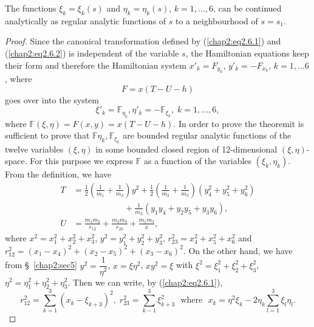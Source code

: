 \begin{subtheorem}\label{chap2:thm2.6.2}
The functions $\xi_k = \xi_k(s)$ and $\eta_k = \eta_k (s)$, $k = 1, \ldots, 6$, can be continued analytically as regular analytic functions of $s$ to a neighbourhood of $s = s_1$. 
\end{subtheorem}

\begin{proof}
Since the canonical transformation defined by (\ref{chap2:eq2.6.1}) and (\ref{chap2:eq2.6.2}) is independent of the variable $s$, the Hamiltonian equations keep their form and therefore the Hamiltonian system $x'_k = F_{y_k}$, $y'_{k} = - F_{x_k}$, $k = 1, \ldots 6$, where
\begin{equation*}
F = x(T - U - h)\tag{2.6.3}\label{chap2:eq2.6.3} 
\end{equation*}
goes over into the system
\begin{equation*}
\xi'_k = \mathbb{F}_{\eta_k}, \eta'_k =- \mathbb{F}_{\xi_k}, \; k = 1, \ldots,6,\tag{2.6.4} \label{chap2:eq2.6.4} 
\end{equation*}
where $\mathbb{F} (\xi, \eta) = F(x,y) = x(T - U - h)$. In order to prove the theorem\pageoriginale it is sufficient to prove that $\mathbb{F} \eta_k, \mathbb{F}_{\xi_k}$ are bounded regular analytic functions of the twelve variables $(\xi, \eta)$ in some bounded closed region of 12-dimensional $(\xi, \eta)$-space. For this purpose we express $\mathbb{F}$ as a function of the variables $(\xi_k, \eta_k)$. From the definition, we have 
\begin{align*}
T &= \frac{1}{2} \left(\frac{1}{m_1} + \frac{1}{m_3} \right)y^2 +
\frac{1}{2} \left(\frac{1}{m_2} + \frac{1}{m_3} \right) \left(y^2_4 +
y^2_5+ y^2_6 \right)\\ 
&\qquad\qquad\qquad + \frac{1}{m_3} \left(y_1 y_4 + y_2 y_5 + y_3 y_6 \right),\\
U&=\frac{m_1 m_2}{r_{12}} + \frac{m_2 m_3}{r_{23}} + \frac{m_1 m_3}{x},
\end{align*}
where $x^2 = x^2_1 + x^2_2 + x^2_3$, $y^2 = y^2_1 + y^2_2 + y^2_3$, $r^2_{23} = x^2_4 + x^2_5 + x^2_6$ and $r^2_{12} = (x_1 - x_4)^2 + (x_2 - x_5)^2 + (x_3-x_6)^2$. On the other hand, we have from \S\ \ref{chap2:sec5} $y^2 = \dfrac{1}{\eta^2}$, $x = \xi \eta^2$, $xy^2 = \xi$ with $\xi^2 = \xi^2_1 + \xi^2_2 + \xi^2_3$, $\eta^2 = \eta^2_1+ \eta^2_2 + \eta^2_3$. Then we can write, by (\ref{chap2:eq2.6.1}), 
$$
r^2_{12} = \sum\limits^3_{k=1} (x_k - \xi_{k+3})^2 , \; r^2_{23} = \sum\limits^3_{k-1} \xi^2_{k+3} \text{~ where ~} x_k = \eta^2 \xi_k - 2\eta_k \sum\limits^3_{l=1} \xi_l \eta_l. 
$$
\end{proof}
